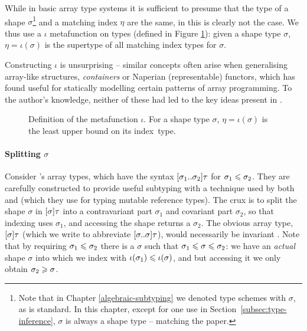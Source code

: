 While in basic array type systems it is sufficient to presume that the type of a shape $\sigma$\footnote{Note that in Chapter \ref{algebraic-subtyping} we denoted type schemes with $\sigma$, as is standard. In this chapter, except for one use in Section~\ref{subsec:type-inference}, $\sigma$ is always a shape type -- matching the paper.} and a matching index $\eta$ are the same, in \starr{} this is clearly not the case. We thus use a $\iota$ metafunction on types (defined in Figure \ref{fig:iota}): given a shape type $\sigma$, $\eta = \iota(\sigma)$ is the supertype of all matching index types for $\sigma$.

Constructing $\iota$ is unsurprising -- similar concepts often arise when generalising array-like structures, \eg{} \textit{containers} \cite{containers} or Naperian (representable) functors, which \textcite{naperian-apl} has found useful for statically modelling certain patterns of array programming. To the author's knowledge, neither of these had led to the key ideas present in \starr{}.

\begin{figure}
    \centering
    
    \caption{Definition of the metafunction $\iota$. For a shape type $\sigma$, $\eta = \iota(\sigma)$ is the least upper bound on its index~type.}
    \label{fig:iota}
\end{figure}

\paragraph{Splitting $\sigma$} Consider \starr{}'s array types, which have the syntax $\sarraytype{\sigma_1}{\sigma_2}{\tau}$ for $\sigma_1 \leqslant \sigma_2$. They are carefully constructed to provide useful subtyping with a technique used by both \textcite{dolan-thesis} and \textcite{pottier-thesis} (which they use for typing mutable reference types). The crux is to split the shape $\sigma$ in $\sonebound{\sigma}\tau$ into a contravariant part $\sigma_1$ and covariant part $\sigma_2$, so that indexing uses $\sigma_1$, and accessing the shape returns a $\sigma_2$. The obvious array type, $\sonebound{\sigma}\tau$ (which we write to abbreviate $\sarraytype{\sigma}{\sigma}{\tau}$), would necessarily be invariant \cite[Appendix~B]{star}. Note that by requiring $\sigma_1 \leqslant \sigma_2$ there is a $\sigma$ such that $\sigma_1 \leqslant \sigma \leqslant \sigma_2$: we have an \emph{actual} shape $\sigma$ into which we index with $\iota(\sigma_1) \leqslant \iota(\sigma)$, and but accessing it we only obtain $\sigma_2 \geqslant \sigma$.

